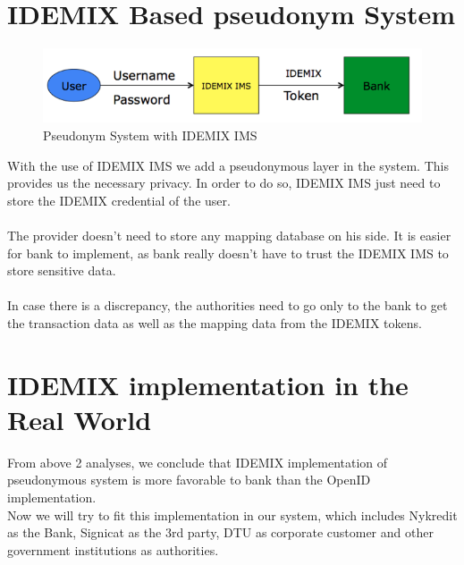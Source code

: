 \section{IDEMIX Based pseudonym System}
\begin{figure}[h]
	\centering
	\includegraphics[width=\textwidth]{figures/IDEMIX}
	\caption{Pseudonym System with IDEMIX IMS}
	\label{fig:IDEMIX}
\end{figure}
With the use of IDEMIX IMS we add a pseudonymous layer in the system. This provides us the necessary privacy. In order to do so, IDEMIX IMS just need to store the IDEMIX credential of the user. 
\\
\\The provider doesn’t need to store any mapping database on his side. It is easier for bank to implement, as bank really doesn’t have to trust the IDEMIX IMS to store sensitive data.
\\
\\In case there is a discrepancy, the authorities need to go only to the bank to get the transaction data as well as the mapping data from the IDEMIX tokens.
\section {IDEMIX implementation in the Real World}
From above 2 analyses, we conclude that IDEMIX implementation of pseudonymous system is more favorable to bank than the OpenID implementation. 
\\Now we will try to fit this implementation in our system, which includes Nykredit as the Bank, Signicat as the 3rd party, DTU as corporate customer and other government institutions as authorities.
